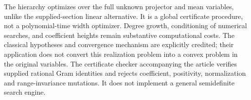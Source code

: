 The hierarchy optimizes over the full unknown projector and mean
variables, unlike the supplied-section linear alternative. It is a
global certificate procedure, not a polynomial-time width optimizer.
Degree growth, conditioning of numerical searches, and coefficient
heights remain substantive computational costs. The classical
hypotheses and convergence mechanism are explicitly credited; their
application does not convert this realization problem into a convex
problem in the original variables. The certificate checker accompanying
the article verifies supplied rational Gram identities and rejects
coefficient, positivity, normalization and range-invariance mutations.
It does not implement a general semidefinite search engine.
